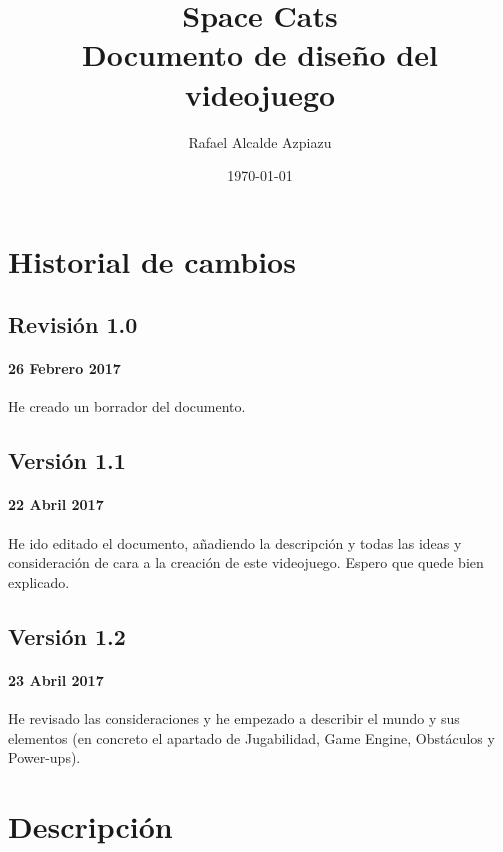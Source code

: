 \documentclass[12pt, spanish, a4paper]{article}
\title{Space Cats \\ Documento de diseño del videojuego}
\date{\today}
\author{Rafael Alcalde Azpiazu}
\begin{document}
	
	\maketitle
	\newpage
	
	\tableofcontents
	\newpage
	
	
	\section*{Historial de cambios}
	
	\subsection*{Revisión 1.0}
	
	\paragraph{26 Febrero 2017} He creado un borrador del documento.
	
	\subsection*{Versión 1.1}
	
	\paragraph{22 Abril 2017} He ido editado el documento, añadiendo la descripción y todas las ideas y consideración de cara a la creación de este videojuego. Espero que quede bien explicado.
	
	\subsection*{Versión 1.2}
	
	\paragraph{23 Abril 2017} He revisado las consideraciones y he empezado a describir el mundo y sus elementos (en concreto el apartado de Jugabilidad, Game Engine, Obstáculos y Power-ups).
	
	\newpage
	
	\section{Descripción}
	
\end{document}
